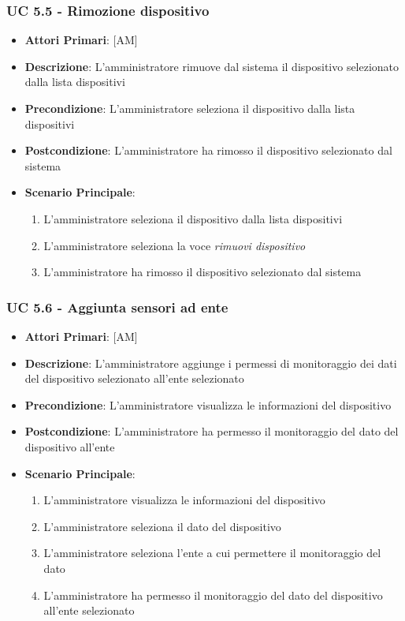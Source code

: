 			\subsubsection{UC 5.5 - Rimozione dispositivo}
			\begin{itemize}
				\item \textbf{Attori Primari}: [AM]
				\item \textbf{Descrizione}: L'amministratore rimuove dal sistema il dispositivo selezionato dalla lista dispositivi
				\item \textbf{Precondizione}: L'amministratore seleziona il dispositivo dalla lista dispositivi
				\item \textbf{Postcondizione}: L'amministratore ha rimosso il dispositivo selezionato dal sistema
				\item \textbf{Scenario Principale}:
				\begin{enumerate}
					\item{L'amministratore seleziona il dispositivo dalla lista dispositivi}
					\item{L'amministratore seleziona la voce \textit{rimuovi dispositivo}}
					\item{L'amministratore ha rimosso il dispositivo selezionato dal sistema}
				\end{enumerate}
			\end{itemize}
			
			\subsubsection{UC 5.6 - Aggiunta sensori ad ente}
			\begin{itemize}
				\item \textbf{Attori Primari}: [AM]
				\item \textbf{Descrizione}: L'amministratore aggiunge i permessi di monitoraggio dei dati del dispositivo selezionato all'ente selezionato
				\item \textbf{Precondizione}: L'amministratore visualizza le informazioni del dispositivo
				\item \textbf{Postcondizione}: L'amministratore ha permesso il monitoraggio del dato del dispositivo all'ente
				\item \textbf{Scenario Principale}:
				\begin{enumerate}
					\item{L'amministratore visualizza le informazioni del dispositivo}
					\item{L'amministratore seleziona il dato del dispositivo}
					\item{L'amministratore seleziona l'ente a cui permettere il monitoraggio del dato}
					\item{L'amministratore ha permesso il monitoraggio del dato del dispositivo all'ente selezionato}
				\end{enumerate}
			\end{itemize}
			
